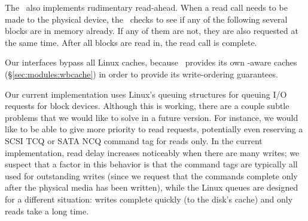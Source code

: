 The \module\ also implements rudimentary read-ahead. When a read call needs to
be made to the physical device, the \module\ checks to see if any of the
following several blocks are in memory already. If any of them are not, they are
also requested at the same time. After all blocks are read in, the read call is
complete.

Our interfaces bypass all Linux caches, because \Kudos\ provides its own
\chdesc-aware caches (\S\ref{sec:modules:wbcache}) in order to provide its
write-ordering guarantees.

Our current implementation uses Linux's queuing structures for queuing I/O
requests for block devices. Although this is working, there are a couple subtle
problems that we would like to solve in a future version. For instance, we would
like to be able to give more priority to read requests, potentially even
reserving a SCSI TCQ or SATA NCQ command tag for reads only. In the current
implementation, read delay increases noticeably when there are many writes; we
suspect that a factor in this behavior is that the command tags are typically
all used for outstanding writes (since we request that the commands complete
only after the physical media has been written), while the Linux queues are
designed for a different situation: writes complete quickly (to the disk's
cache) and only reads take a long time.
